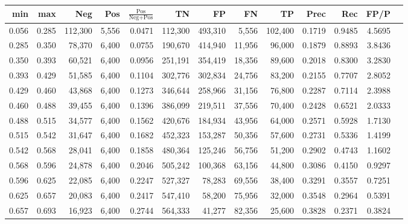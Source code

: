 \begin{tabular}{rrrrrrrrrrrrr}
\toprule
  min &   max &     Neg &   Pos & $\frac{\text{Pos}}{\text{Neg}+\text{Pos}}$ &      TN &      FP &      FN &      TP &   Prec &    Rec &   FP/P \\
\midrule
0.056 & 0.285 & 112,300 & 5,556 &                                     0.0471 & 112,300 & 493,310 &   5,556 & 102,400 & 0.1719 & 0.9485 & 4.5695 \\
0.285 & 0.350 &  78,370 & 6,400 &                                     0.0755 & 190,670 & 414,940 &  11,956 &  96,000 & 0.1879 & 0.8893 & 3.8436 \\
0.350 & 0.393 &  60,521 & 6,400 &                                     0.0956 & 251,191 & 354,419 &  18,356 &  89,600 & 0.2018 & 0.8300 & 3.2830 \\
0.393 & 0.429 &  51,585 & 6,400 &                                     0.1104 & 302,776 & 302,834 &  24,756 &  83,200 & 0.2155 & 0.7707 & 2.8052 \\
0.429 & 0.460 &  43,868 & 6,400 &                                     0.1273 & 346,644 & 258,966 &  31,156 &  76,800 & 0.2287 & 0.7114 & 2.3988 \\
0.460 & 0.488 &  39,455 & 6,400 &                                     0.1396 & 386,099 & 219,511 &  37,556 &  70,400 & 0.2428 & 0.6521 & 2.0333 \\
0.488 & 0.515 &  34,577 & 6,400 &                                     0.1562 & 420,676 & 184,934 &  43,956 &  64,000 & 0.2571 & 0.5928 & 1.7130 \\
0.515 & 0.542 &  31,647 & 6,400 &                                     0.1682 & 452,323 & 153,287 &  50,356 &  57,600 & 0.2731 & 0.5336 & 1.4199 \\
0.542 & 0.568 &  28,041 & 6,400 &                                     0.1858 & 480,364 & 125,246 &  56,756 &  51,200 & 0.2902 & 0.4743 & 1.1602 \\
0.568 & 0.596 &  24,878 & 6,400 &                                     0.2046 & 505,242 & 100,368 &  63,156 &  44,800 & 0.3086 & 0.4150 & 0.9297 \\
0.596 & 0.625 &  22,085 & 6,400 &                                     0.2247 & 527,327 &  78,283 &  69,556 &  38,400 & 0.3291 & 0.3557 & 0.7251 \\
0.625 & 0.657 &  20,083 & 6,400 &                                     0.2417 & 547,410 &  58,200 &  75,956 &  32,000 & 0.3548 & 0.2964 & 0.5391 \\
0.657 & 0.693 &  16,923 & 6,400 &                                     0.2744 & 564,333 &  41,277 &  82,356 &  25,600 & 0.3828 & 0.2371 & 0.3824 \\

\end{tabular}
